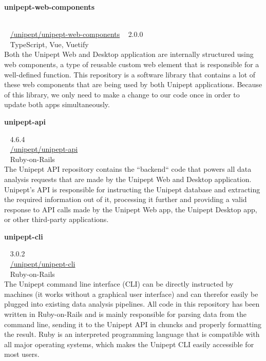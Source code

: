 \begin{large}\textbf{\textsf{unipept-web-components}}\end{large} \\
\faGithub ~ \href{https://github.com/unipept/unipept-web-components}{\textsf{/unipept/unipept-web-components}} \hfill \faTag ~ \textsf{2.0.0} \\
\faCode ~ \textsf{TypeScript, Vue, Vuetify} \\
Both the Unipept Web and Desktop application are internally structured using web components, a type of reusable custom web element that is responsible for a well-defined function.
This repository is a software library that contains a lot of these web components that are being used by both Unipept applications.
Because of this library, we only need to make a change to our code once in order to update both apps simultaneously.

\begin{large}\textbf{\textsf{unipept-api}}\end{large} \hfill \faTag ~ \textsf{4.6.4} \\
\faGithub ~ \href{https://github.com/unipept/unipept-api}{\textsf{/unipept/unipept-api}} \\
\faCode ~ \textsf{Ruby-on-Rails} \\
The Unipept API repository contains the ``backend`` code that powers all data analysis requests that are made by the Unipept Web and Desktop application.
Unipept's API is responsible for instructing the Unipept database and extracting the required information out of it, processing it further and providing a valid response to API calls made by the Unipept Web app, the Unipept Desktop app, or other third-party applications.

\begin{large}\textbf{\textsf{unipept-cli}}\end{large} \hfill \faTag ~ \textsf{3.0.2} \\
\faGithub ~ \href{https://github.com/unipept/unipept-cli}{\textsf{/unipept/unipept-cli}} \\
\faCode ~ \textsf{Ruby-on-Rails} \\
The Unipept command line interface (CLI) can be directly instructed by machines (it works without a graphical user interface) and can therefor easily be plugged into existing data analysis pipelines.
All code in this repository has been written in Ruby-on-Rails and is mainly responsible for parsing data from the command line, sending it to the Unipept API in chuncks and properly formatting the result.
Ruby is an interpreted programming language that is compatible with all major operating systems, which makes the Unipept CLI easily accessible for most users.

